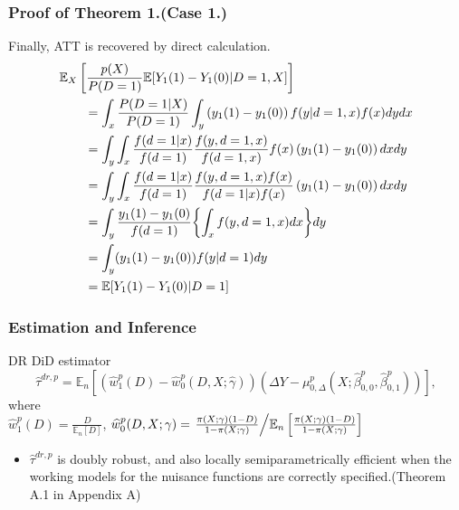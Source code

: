 \documentclass{beamer}
\begin{document}
\begin{frame}\frametitle{Proof of Theorem 1.(Case 1.)}
    Finally, ATT is recovered by direct calculation.
    \begin{align*}
        \MoveEqLeft
        \mathbb{E}_{X}\left[\frac{p(X)}{P(D = 1)}\mathbb{E}[Y_{1}(1) - Y_{1}(0)|D = 1, X]\right]
        \\&=
        \int_{x}\frac{P(D = 1|X)}{P(D = 1)} \int_{y} \left(y_{1}(1) - y_{1}(0)\right)f(y|d = 1, x)f(x)dydx
        \\&=
        \int_{y}\int_{x}\frac{f(d = 1|x)}{f(d = 1)}\frac{f(y, d = 1, x)}{f(d = 1, x)}f(x)\left(y_{1}(1) - y_{1}(0)\right)dxdy
        \\&=
        \int_{y}\int_{x}\frac{f(d = 1|x)}{f(d = 1)}\frac{f(y, d = 1, x)f(x)}{f(d = 1 |x)f(x)}\left(y_{1}(1) - y_{1}(0)\right)dxdy
        \\&=
        \int_{y}\frac{y_{1}(1) - y_{1}(0)}{f(d = 1)} \biggl \{ \int_{x}f(y, d = 1, x)dx \biggl \} dy
        \\&=
        \int_{y}(y_{1}(1) - y_{1}(0))f(y|d = 1)dy
        \\&=
        \mathbb{E}[Y_{1}(1) - Y_{1}(0)|D = 1]
    \end{align*}
\end{frame}

\begin{frame}\frametitle{Estimation and Inference}
    \begin{block}{DR DiD estimator}
        \begin{equation*}
            \widehat{\tau}^{dr,p} = \mathbb{E}_{n}\left[(\widehat{w}^{p}_{1}(D) - \widehat{w}^{p}_{0}(D,X;\widehat{\gamma}))(\Delta Y - \mu^{p}_{0, \Delta}(X;\widehat{\beta}^{p}_{0,0},\widehat{\beta}^{p}_{0,1}))\right],
        \end{equation*}
        where\\
        $\widehat{w}^{p}_{1}(D) = \frac{D}{\mathbb{E}_{n}[D]}$, $\widehat{w}^{p}_{0}(D,X;\gamma) = \left. \frac{\pi(X;\gamma)(1-D)}{1-\pi(X;\gamma)}\middle/ \mathbb{E}_{n}\left[\frac{\pi(X;\gamma)(1-D)}{1-\pi(X;\gamma)}\right]\right.$
    \end{block}
    \begin{itemize}
        \item $\widehat{\tau}^{dr,p}$ is doubly robust, and also locally semiparametrically efficient when the working models for the nuisance functions are correctly specified.(Theorem A.1 in Appendix A)
    \end{itemize}
\end{frame}
\end{document}
